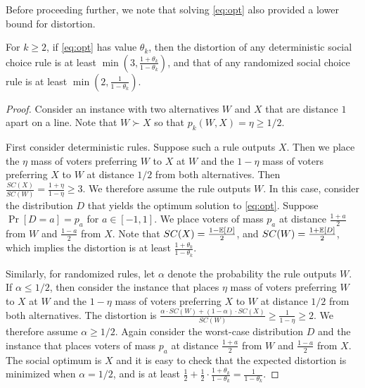 Before proceeding further, we note that solving \cref{eq:opt} also provided a lower bound for distortion.

\begin{theorem}
\label{thm:lb_main}
For $k \ge 2$, if \cref{eq:opt} has value $\theta_k$, then the distortion of any deterministic social choice rule is at least $\min\left(3,\frac{1+\theta_k}{1-\theta_k}\right)$, and that of any randomized social choice rule is at least $\min\left(2,\frac{1}{1-\theta_k}\right)$.
\end{theorem}
\begin{proof}
Consider an instance with two alternatives $W$ and $X$ that are distance $1$ apart on a line. Note that $W \succ X$ so that $p_k(W,X) = \eta \ge 1/2$. 

First consider deterministic rules. Suppose such a rule outputs $X$. Then we place the $\eta$ mass of voters preferring $W$ to $X$ at  $W$ and the $1-\eta$ mass of voters preferring $X$ to $W$ at distance $1/2$ from both alternatives.  Then $\frac{SC(X)}{SC(W)} = \frac{1+\eta}{1-\eta} \ge 3$. We therefore assume the rule outputs $W$. In this case, consider the distribution $D$ that yields the optimum solution to \cref{eq:opt}. Suppose $\Pr[D = a] = p_a$ for $a \in [-1,1]$. We place voters of mass $p_a$ at distance $\frac{1+a}{2}$ from $W$ and $\frac{1-a}{2}$ from $X$. Note that $SC(X) = \frac{1 - \mathbb{E}[D]}{2}$, and $SC(W) = \frac{1 + \mathbb{E}[D]}{2}$, which implies the distortion is at least  $\frac{1+\theta_k}{1-\theta_k}$.

Similarly, for randomized rules, let $\alpha$ denote the probability the rule outputs $W$. If $\alpha \le 1/2$, then consider the instance that places $\eta$ mass of voters preferring $W$ to $X$ at  $W$ and the $1-\eta$ mass of voters preferring $X$ to $W$ at distance $1/2$ from both alternatives. The distortion is  $\frac{\alpha \cdot SC(W) + (1-\alpha) \cdot SC(X)}{SC(W)} \ge \frac{1}{1-\eta} \ge 2$. We therefore assume $\alpha \ge 1/2$. Again consider the worst-case distribution $D$ and the instance that places voters of mass $p_a$ at distance $\frac{1+a}{2}$ from $W$ and $\frac{1-a}{2}$ from $X$. The social optimum is $X$ and it is easy to check that the  expected distortion is minimized when $\alpha = 1/2$, and is at least  $\frac{1}{2} + \frac{1}{2} \cdot \frac{1+\theta_k}{1-\theta_k} = \frac{1}{1-\theta_k}.$
\end{proof}




